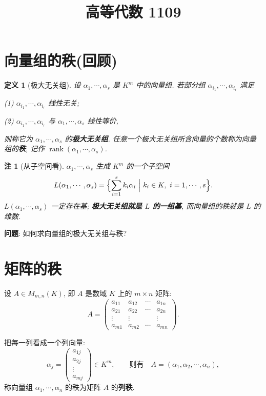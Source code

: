 \documentclass[UTF8,11pt]{ctexart}
\title{高等代数 1109}
\date{}
\theoremstyle{cnthm}
\newtheorem{defn}[thm]{定义}
\newtheorem{rem}[thm]{注}
\begin{document}
\maketitle

\section{向量组的秩(回顾)}

\begin{defn}[极大无关组]
设 $\alpha_1,\cdots,\alpha_s$ 是 $K^m$ 中的向量组. 若部分组 $\alpha_{i_1},\cdots,\alpha_{i_r}$ 满足

(1) $\alpha_{i_1},\cdots,\alpha_{i_r}$ 线性无关;

(2) $\alpha_{i_1},\cdots,\alpha_{i_r}$ 与 $\alpha_1,\cdots,\alpha_s$ 线性等价,

则称它为 $\alpha_1,\cdots,\alpha_s$ 的\textbf{极大无关组}. 任意一个极大无关组所含向量的个数称为向量组的\textbf{秩}, 记作 $\operatorname{rank}(\alpha_1,\cdots,\alpha_s)$.
\end{defn}

\begin{rem}[从子空间看]
$\alpha_1,\cdots,\alpha_s$ 生成 $K^m$ 的一个子空间
\[
L(\alpha_1,\cdots,\alpha_s)=\Bigl\{\sum_{i=1}^{s}k_i\alpha_i\ \Big|\ k_i\in K,\ i=1,\cdots,s\Bigr\} .
\]
$L(\alpha_1,\cdots,\alpha_s)$ 一定存在基; \textbf{极大无关组就是 $L$ 的一组基}, 而向量组的秩就是 $L$ 的维数.
\end{rem}

\textbf{问题}: 如何求向量组的极大无关组与秩?

\section{矩阵的秩}

设 $A\in M_{m,n}(K)$, 即 $A$ 是数域 $K$ 上的 $m\times n$ 矩阵:
\[
A=\begin{pmatrix}
a_{11}&a_{12}&\cdots&a_{1n}\\
a_{21}&a_{22}&\cdots&a_{2n}\\
\vdots&\vdots&&\vdots\\
a_{m1}&a_{m2}&\cdots&a_{mn}
\end{pmatrix}.
\]

把每一列看成一个列向量:
\[
\alpha_j=\begin{pmatrix}a_{1j}\\a_{2j}\\\vdots\\a_{mj}\end{pmatrix}\in K^m,
\qquad\text{则有}\quad A=(\alpha_1,\alpha_2,\cdots,\alpha_n),
\]
称向量组 $\alpha_1,\cdots,\alpha_n$ 的秩为矩阵 $A$ 的\textbf{列秩}.
\end{document}
